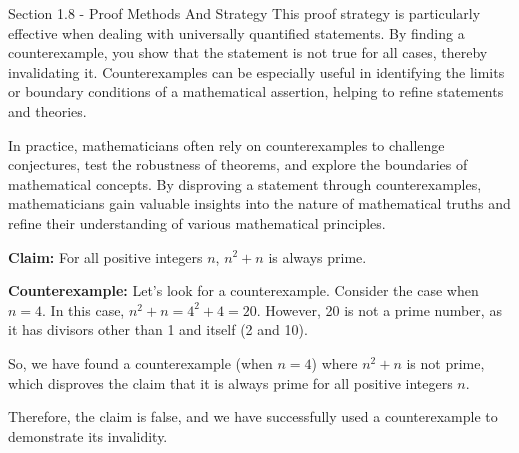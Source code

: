 \begin{notes}{Section 1.8 - Proof Methods And Strategy}
    This proof strategy is particularly effective when dealing with universally quantified statements. By finding a counterexample, you show that the statement is not true for all cases, thereby invalidating it. Counterexamples 
    can be especially useful in identifying the limits or boundary conditions of a mathematical assertion, helping to refine statements and theories.

    In practice, mathematicians often rely on counterexamples to challenge conjectures, test the robustness of theorems, and explore the boundaries of mathematical concepts. By disproving a statement through counterexamples, 
    mathematicians gain valuable insights into the nature of mathematical truths and refine their understanding of various mathematical principles.

    \begin{highlight}
        \textbf{Claim:} For all positive integers \(n\), \(n^2 + n\) is always prime.
    
    
        \textbf{Counterexample:} Let's look for a counterexample. Consider the case when \(n = 4\). In this case, \(n^2 + n = 4^2 + 4 = 20\). However, 20 is not a prime number, as it has divisors other than 1 and itself (2 and 10). 
    
        So, we have found a counterexample (when \(n = 4\)) where \(n^2 + n\) is not prime, which disproves the claim that it is always prime for all positive integers \(n\).
    
    
        Therefore, the claim is false, and we have successfully used a counterexample to demonstrate its invalidity.
    \end{highlight}
    
\end{notes}